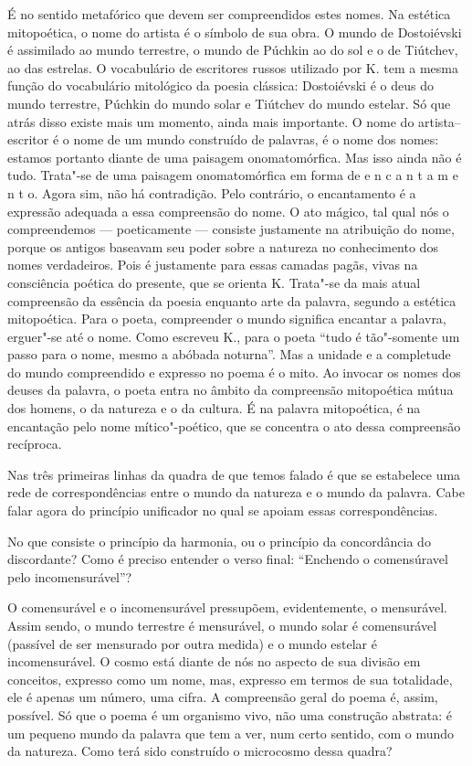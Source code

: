 {É no sentido metafórico que devem ser compreendidos estes nomes. Na
estética mitopoética, o nome do artista é o símbolo de sua obra. O mundo
de Dostoiévski é assimilado ao mundo terrestre, o mundo de Púchkin ao do
sol e o de Tiútchev, ao das estrelas. O vocabulário de escritores russos
utilizado por K. tem a mesma função do vocabulário mitológico da poesia
clássica: Dostoiévski é o deus do mundo terrestre, Púchkin do mundo
solar e Tiútchev do mundo estelar. Só que atrás disso existe mais um
momento, ainda mais importante. O nome do artista--escritor é o nome de
um mundo construído de palavras, é o nome dos nomes: estamos portanto
diante de uma paisagem onomatomórfica. Mas isso ainda não é tudo.
Trata"-se de uma paisagem onomatomórfica em forma de e n c a n t a m e n
t o. Agora sim, não há contradição. Pelo contrário, o encantamento é a
expressão adequada a essa compreensão do nome. O ato mágico, tal qual
nós o compreendemos --- poeticamente --- consiste justamente na
atribuição do nome, porque os antigos baseavam seu poder sobre a
natureza no conhecimento dos nomes verdadeiros. Pois é justamente para
essas camadas pagãs, vivas na consciência poética do presente, que se
orienta K. Trata"-se da mais atual compreensão da essência da poesia
enquanto arte da palavra, segundo a estética mitopoética. Para o poeta,
compreender o mundo significa encantar a palavra, erguer"-se até o nome.
Como escreveu K., para o poeta ``tudo é tão"-somente um passo para o
nome, mesmo a abóbada noturna''. Mas a unidade e a completude do mundo
compreendido e expresso no poema é o mito. Ao invocar os nomes dos
deuses da palavra, o poeta entra no âmbito da compreensão mitopoética
mútua dos homens, o da natureza e o da cultura. É na palavra
mitopoética, é na encantação pelo nome mítico"-poético, que se concentra
o ato dessa compreensão recíproca.

Nas três primeiras linhas da quadra de que temos falado é que se
estabelece uma rede de correspondências entre o mundo da natureza e o
mundo da palavra. Cabe falar agora do princípio unificador no qual se
apoiam essas correspondências.

No que consiste o princípio da harmonia, ou o princípio da concordância
do discordante? Como é preciso entender o verso final: ``Enchendo o
comensúravel pelo incomensurável''?

O comensurável e o incomensurável pressupõem, evidentemente, o
mensurável. Assim sendo, o mundo terrestre é mensurável, o mundo solar é
comensurável (passível de ser mensurado por outra medida) e o mundo
estelar é incomensurável. O cosmo está diante de nós no aspecto de sua
divisão em conceitos, expresso como um nome, mas, expresso em termos de
sua totalidade, ele é apenas um número, uma cifra. A compreensão geral do
poema é, assim, possível. Só que o poema é um organismo vivo, não uma
construção abstrata: é um pequeno mundo da palavra que tem a ver, num
certo sentido, com o mundo da natureza. Como terá sido construído o
microcosmo dessa quadra?

}
